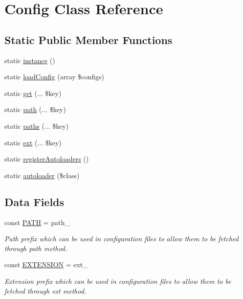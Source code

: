 \hypertarget{class_lora_1_1_config}{}\section{Config Class Reference}
\label{class_lora_1_1_config}
\subsection*{Static Public Member Functions}
\begin{DoxyCompactItemize}
\item 
static \hyperlink{class_lora_1_1_config_a0deb004950b8dc4f51836316fd19c111}{instance} ()
\item 
static \hyperlink{class_lora_1_1_config_ac14c17dc35a55cd5a44db48d7d7d1fd9}{load\+Config} (array \$configs)
\item 
static \hyperlink{class_lora_1_1_config_a9f949bb49001886679ff026aba1c3a5a}{get} (... \$key)
\item 
static \hyperlink{class_lora_1_1_config_aade770941642defa7b826ff3ad193b4a}{path} (... \$key)
\item 
static \hyperlink{class_lora_1_1_config_a36845afbe5fedb71da890df0ada263f6}{paths} (... \$key)
\item 
static \hyperlink{class_lora_1_1_config_a98a88f17bbc72a1f26f54b264be26068}{ext} (... \$key)
\item 
static \hyperlink{class_lora_1_1_config_af12ac9985e38465b53443034489f3526}{register\+Autoloaders} ()
\item 
static \hyperlink{class_lora_1_1_config_a5d5d9fa893f5a5a8db61062e78248450}{autoloader} (\$class)
\end{DoxyCompactItemize}
\subsection*{Data Fields}
\begin{DoxyCompactItemize}
\item 
\mbox{\label{class_lora_1_1_config_a1fc0f693347c58a8714672eeffa2e134}} 
const \hyperlink{class_lora_1_1_config_a1fc0f693347c58a8714672eeffa2e134}{P\+A\+TH} = \textquotesingle{}path\+\_\+\textquotesingle{}
\begin{DoxyCompactList}\small\item\em Path prefix which can be used in configuration files to allow them to be fetched through path method. \end{DoxyCompactList}\item 
\mbox{\label{class_lora_1_1_config_a946f0934b6d4dce0bc46dbdb9119a624}} 
const \hyperlink{class_lora_1_1_config_a946f0934b6d4dce0bc46dbdb9119a624}{E\+X\+T\+E\+N\+S\+I\+ON} = \textquotesingle{}ext\+\_\+\textquotesingle{}
\begin{DoxyCompactList}\small\item\em Extension prefix which can be used in configuration files to allow them to be fetched through ext method. \end{DoxyCompactList}\end{DoxyCompactItemize}
